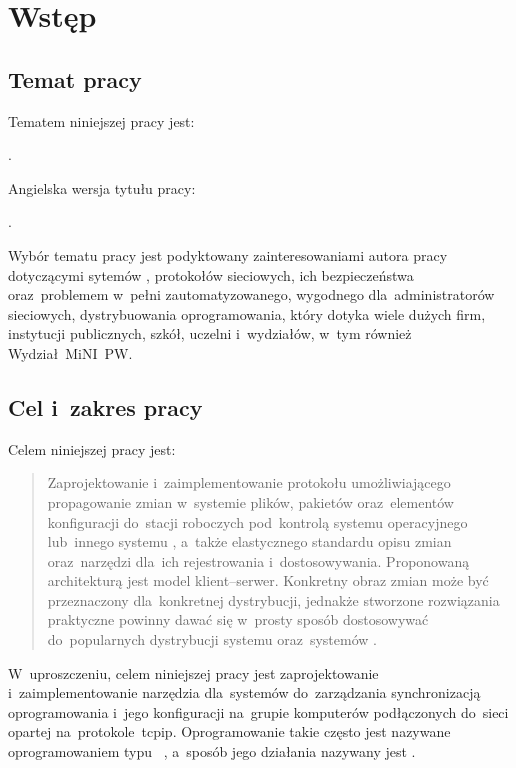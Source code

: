 \documentclass[thesis]{subfiles}
\makeatletter
\let\inserttitle\@title
\let\inserttitleaux\@titleaux
\makeatother
\begin{document}
\chapter{Wstęp}
\label{chapter:intro}


\section{Temat pracy}

\noindent Tematem niniejszej pracy jest:
\begin{displayquote}
\inserttitle.
\end{displayquote}
Angielska wersja tytułu pracy:
\begin{displayquote}
\inserttitleaux.
\end{displayquote}
Wybór tematu pracy jest podyktowany zainteresowaniami autora pracy dotyczącymi sytemów , protokołów sieciowych, ich bezpieczeństwa oraz~problemem w~pełni zautomatyzowanego, wygodnego dla~administratorów sieciowych, dystrybuowania oprogramowania, który dotyka wiele dużych firm, instytucji publicznych, szkół, uczelni i~wydziałów, w~tym również Wydział~MiNI~PW.


\section{Cel i~zakres pracy}
\label{cel-i-zakres}

\noindent Celem niniejszej pracy jest:
\blockcquote{formularz-zgloszenia-pracy}{Zaprojektowanie i~zaimplementowanie protokołu umożliwiającego propagowanie zmian w~systemie plików, pakietów oraz~elementów konfiguracji do~stacji roboczych pod~kontrolą systemu operacyjnego  lub~innego systemu , a~także elastycznego standardu opisu zmian oraz~narzędzi dla~ich rejestrowania i~dostosowywania. Proponowaną architekturą jest model klient--serwer. Konkretny obraz zmian może być przeznaczony dla~konkretnej dystrybucji, jednakże stworzone rozwiązania praktyczne powinny dawać się w~prosty sposób dostosowywać do~popularnych dystrybucji systemu  oraz~systemów .}
W~uproszczeniu, celem niniejszej pracy jest zaprojektowanie i~zaimplementowanie narzędzia dla~systemów  do~zarządzania synchronizacją oprogramowania i~jego konfiguracji na~grupie komputerów podłączonych do~sieci opartej na~protokole~\gls{tcpip}. Oprogramowanie takie często jest nazywane oprogramowaniem typu ~\cite{wiki:scm}, a~sposób jego działania nazywany jest .
\end{document}
